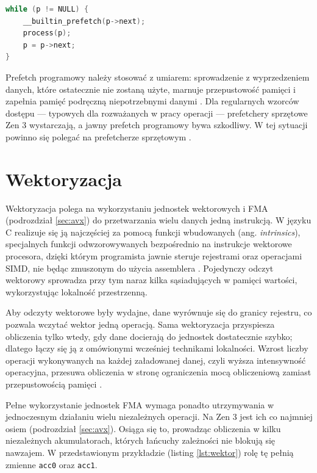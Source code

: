 \documentclass[a4paper,12pt]{book} %
\begin{document}
\begin{lstfloat}[t!]
\begin{lstlisting}[language=C, caption={Prefetch programowy przy przechodzeniu listy: następny węzeł jest sprowadzany z wyprzedzeniem, podczas gdy przetwarzany jest bieżący}, label={lst:prefetch}]
while (p != NULL) {
    __builtin_prefetch(p->next);
    process(p);
    p = p->next;
}
\end{lstlisting}
\end{lstfloat}

Prefetch programowy należy stosować z umiarem: sprowadzenie z wyprzedzeniem danych, które ostatecznie nie zostaną użyte, marnuje przepustowość pamięci i zapełnia pamięć podręczną niepotrzebnymi danymi \cite{drepper2007memory}. Dla regularnych wzorców dostępu --- typowych dla rozważanych w pracy operacji --- prefetchery sprzętowe Zen 3 wystarczają, a jawny prefetch programowy bywa szkodliwy. W tej sytuacji powinno się polegać na prefetcherze sprzętowym \cite{lee2012prefetching,drepper2007memory}.

\section{Wektoryzacja}
\label{sec:wektoryzacja}

Wektoryzacja polega na wykorzystaniu jednostek wektorowych i FMA (podrozdział \ref{sec:avx}) do przetwarzania wielu danych jedną instrukcją. W języku C realizuje się ją najczęściej za pomocą funkcji wbudowanych (ang. \emph{intrinsics}), specjalnych funkcji odwzorowywanych bezpośrednio na instrukcje wektorowe procesora, dzięki którym programista jawnie steruje rejestrami oraz operacjami SIMD, nie będąc zmuszonym do użycia assemblera \cite{gepner2017avx2}. Pojedynczy odczyt wektorowy sprowadza przy tym naraz kilka sąsiadujących w pamięci wartości, wykorzystując lokalność przestrzenną.

Aby odczyty wektorowe były wydajne, dane wyrównuje się do granicy rejestru, co pozwala wczytać wektor jedną operacją. Sama wektoryzacja przyspiesza obliczenia tylko wtedy, gdy dane docierają do jednostek dostatecznie szybko; dlatego łączy się ją z omówionymi wcześniej technikami lokalności. Wzrost liczby operacji wykonywanych na każdej załadowanej danej, czyli wyższa intensywność operacyjna, przesuwa obliczenia w stronę ograniczenia mocą obliczeniową zamiast przepustowością pamięci \cite{williams2009roofline}.

Pełne wykorzystanie jednostek FMA wymaga ponadto utrzymywania w jednoczesnym działaniu wielu niezależnych operacji. Na Zen 3 jest ich co najmniej osiem (podrozdział \ref{sec:avx}). Osiąga się to, prowadząc obliczenia w kilku niezależnych akumulatorach, których łańcuchy zależności nie blokują się nawzajem. W przedstawionym przykładzie (listing \ref{lst:wektor}) rolę tę pełnią zmienne \texttt{acc0} oraz \texttt{acc1}.
\end{document}
